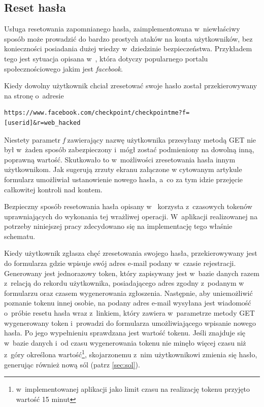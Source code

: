 \documentclass[11pt]{aghdpl}
\begin{document}

\subsection{Reset hasła}
\label{sec:resetHaslaBezp}

Usługa resetowania zapomnianego hasła, zaimplementowana w~niewłaściwy sposób może prowadzić do bardzo prostych ataków na konta użytkowników, bez konieczności posiadania dużej wiedzy w~dziedzinie bezpieczeństwa. Przykładem tego jest sytuacja opisana w~\cite{FbB}, która dotyczy popularnego portalu społecznościowego jakim jest \emph{facebook}.

Kiedy dowolny użytkownik chciał zresetować swoje hasło został przekierowywany na stronę o~adresie
\begin{lstlisting}
https://www.facebook.com/checkpoint/checkpointme?f=[userid]&r=web_hacked
\end{lstlisting}

Niestety parametr \emph{f} zawierający nazwę użytkownika przesyłany metodą GET nie był w~żaden sposób zabezpieczony i~mógł zostać podmieniony na dowolną inną, poprawną wartość. Skutkowało to w~możliwości zresetowania hasła innym użytkownikom. Jak sugerują zrzuty ekranu załączone w cytowanym artykule formularz umożliwiał ustanowienie nowego hasła, a~co za tym idzie przejęcie całkowitej kontroli nad kontem.

Bezpieczny sposób resetowania hasła opisany w~\cite{CSH} korzysta z~czasowych tokenów uprawniających do wykonania tej wrażliwej operacji. W~aplikacji realizowanej na potrzeby niniejszej pracy zdecydowano się na implementację tego właśnie schematu.

Kiedy użytkownik zgłasza chęć zresetowania swojego hasła, przekierowywany jest do formularza gdzie wpisuje swój adres e-mail podany w~czasie rejestracji. Generowany jest jednorazowy token, który zapisywany jest w~bazie danych razem z~relacją do rekordu użytkownika, posiadającego adres zgodny z~podanym w formularzu oraz czasem wygenerowania zgłoszenia. Następnie, aby uniemożliwić poznanie tokenu innej osobie, na podany adres e-mail wysyłana jest wiadomość o~próbie resetu hasła wraz z~linkiem, który zawiera w~parametrze metody GET wygenerowany token i~prowadzi do formularza umożliwiającego wpisanie nowego hasła. Po jego wypełnieniu sprawdzana jest wartość tokenu. Jeśli znajduje się w~bazie danych i~od czasu wygenerowania tokenu nie minęło więcej czasu niż z~góry określona wartość\footnote{w~implementowanej aplikacji jako limit czasu na realizację tokenu przyjęto wartość 15 minut}, skojarzonemu z~nim użytkownikowi zmienia się hasło, generując również nową sól (patrz \ref{sec:sol}).
\end{document}
